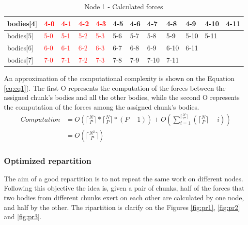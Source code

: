 \documentclass[a4paper]{article}
\begin{document}
\begin{table}[]
\centering
\caption{Node 1 - Calculated forces}
\label{table:t2}
\begin{tabular}{l|lllllllllll}
bodies{[}4{]} & \textcolor{red}{4-0} & \textcolor{red}{4-1} & \textcolor{red}{4-2} & \textcolor{red}{4-3} & 4-5 & 4-6 & 4-7  & 4-8  & 4-9  & 4-10 & 4-11 \\ \hline
bodies{[}5{]} & \textcolor{red}{5-0} & \textcolor{red}{5-1} & \textcolor{red}{5-2} & \textcolor{red}{5-3} & 5-6 & 5-7 & 5-8  & 5-9  & 5-10 & 5-11 &      \\ \hline
bodies{[}6{]} & \textcolor{red}{6-0} & \textcolor{red}{6-1} & \textcolor{red}{6-2} & \textcolor{red}{6-3} & 6-7 & 6-8 & 6-9  & 6-10 & 6-11 &      &      \\ \hline
bodies{[}7{]} & \textcolor{red}{7-0} & \textcolor{red}{7-1} & \textcolor{red}{7-2} & \textcolor{red}{7-3} & 7-8 & 7-9 & 7-10 & 7-11 &      &      &     
\end{tabular}
\end{table}


An approximation of the computational complexity is shown on the Equation \ref{eq:eq1}). The first O represents the computation of the forces between the assigned chunk's bodies and all the other bodies, while the second O represents the computation of the forces among the assigned chunk's bodies. \\

\begin{equation} 
\label{eq:eq1}
\begin{split}
Computation & = O(\lceil\frac{N}{P}\rceil * \lceil\frac{N}{P}\rceil * (P-1)) +  O(\sum_{i=1}^{\lceil\frac{N}{P}\rceil} {(\lceil\frac{N}{P}\rceil-i)})\\
 & = O(\lceil\frac{N^2}{P}\rceil)
\end{split}
\end{equation}


\subsubsection{Optimized repartition}
\label{sec:opt_rep}
The aim of a good repartition is to not repeat the same work on different nodes. Following this objective the idea is, given a pair of chunks, half of the forces that two bodies from different chunks exert on each other are calculated by one node, and half by the other. The ripartition is clarify on the Figures \ref{fig:pr1}, \ref{fig:pr2} and \ref{fig:pr3}.
\end{document}
